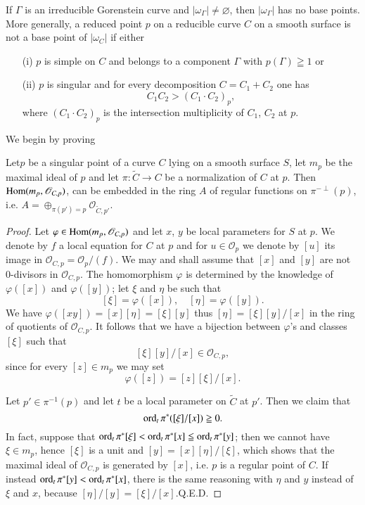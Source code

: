 \begin{alphprop}\label{art04-propB}
If $\Gamma$ is an irreducible Gorenstein curve and
$|\omega_{\Gamma}|\neq \varnothing$, then $|\omega_{\Gamma}|$ has no
base points. More generally,  a reduced point $p$ on a reducible curve
$C$ on a smooth surface is not a base point of $|\omega_{C}|$ if
either
\begin{itemize}
\item[\rm(i)] $p$ is simple on $C$ and belongs to a component $\Gamma$
with $p(\Gamma)\geqq 1$ or

\item[\rm(ii)] $p$ is singular and for every decomposition
$C=C_{1}+C_{2}$ one has 
$$
C_{1}C_{2}>(C_{1}\cdot C_{2})_{p},
$$
where $(C_{1}\cdot C_{2})_{p}$ is the intersection multiplicity of
$C_{1}$, $C_{2}$ at $p$.
\end{itemize}
\end{alphprop}

We begin by proving

\setcounter{dashlemma}{1}
\begin{dashlemma}\label{art04-lemB'}
Let\pageoriginale $p$ be a singular point of a curve $C$ lying on a
smooth surface $S$, let $m_{p}$ be the maximal ideal of $p$ and let
$\pi:\widetilde{C}\to C$ be a normalization of $C$ at $p$. Then
$\operatorname{Hom}(m_{p},\mathscr{O}_{C,p})$, can be embedded in the ring $A$ of
regular functions on $\pi^{-\perp}(p)$, i.e. $A=\oplus_{\pi(p')=p}\mathscr{O}_{\widetilde{C},p'}$.
\end{dashlemma}

\begin{proof}
Let $\varphi\in \operatorname{Hom}(m_{p},\mathscr{O}_{C,p})$ and let $x$, $y$ be
local parameters for $S$ at $p$. We denote by $f$ a local equation for
$C$ at $p$ and for $u\in \mathscr{O}_{p}$ we denote by $[u]$ its image
in $\mathscr{O}_{C,p}=\mathscr{O}_{p}/(f)$. We may and shall assume
that $[x]$ and $[y]$ are not 0-divisors in $\mathscr{O}_{C,p}$. The
homomorphism $\varphi$ is determined by the knowledge of
$\varphi([x])$ and $\varphi([y])$; let $\xi$ and $\eta$ be such that
$$
[\xi]=\varphi([x]),\quad [\eta]=\varphi([y]).
$$
We have $\varphi([xy])=[x][\eta]=[\xi][y]$ thus $[\eta]=[\xi][y]/[x]$
in the ring of quotients of $\mathscr{O}_{C,p}$. It follows that we
have a bijection between $\varphi$'s and classes $[\xi]$ such that
$$
[\xi][y]/[x]\in \mathscr{O}_{C,p},
$$
since for every $[z]\in m_{p}$ we may set
$$
\varphi([z])=[z][\xi]/[x].
$$

Let $p'\in \pi^{-1}(p)$ and let $t$ be a local parameter on
$\widetilde{C}$ at $p'$. Then we claim that
$$
\operatorname{ord}_{t}\pi^{*}([\xi]/[x])\geqq 0.
$$
In fact, suppose that
$\operatorname{ord}_{t}\pi^{*}[\xi]<\operatorname{ord}_{t}\pi^{*}[x]\leqq \operatorname{ord}_{t}\pi^{*}[y]$;
then we cannot have $\xi\in m_{p}$, hence $[\xi]$ is a unit and
$[y]=[x][\eta]/[\xi]$, which shows that the maximal ideal of
$\mathscr{O}_{C,p}$ is generated by $[x]$, i.e. $p$ is a regular point
of $C$. If instead $\operatorname{ord}_{t}\pi^{*}[y]<\operatorname{ord}_{t}\pi^{*}[x]$, there is
the same reasoning with $\eta$ and $y$ instead of $\xi$ and $x$,
because $[\eta]/[y]=[\xi]/[x]$.\hfill Q.E.D.
\end{proof}

